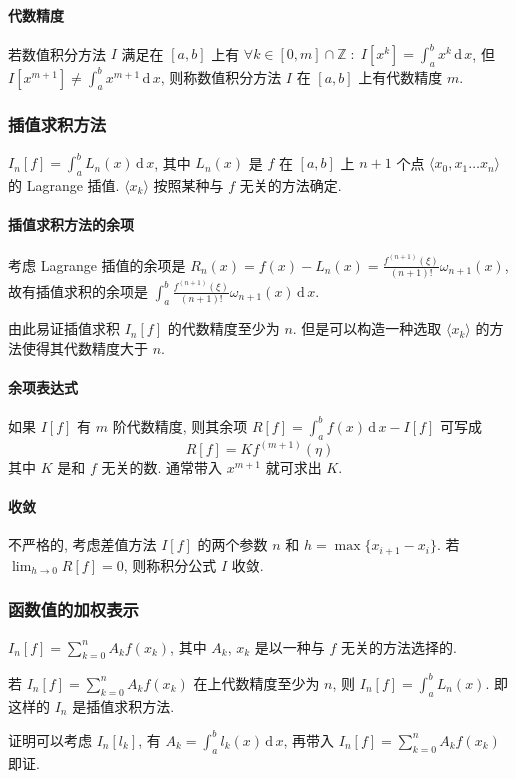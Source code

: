 \documentclass{ctexart}
\newcommand{\Zset}{\mathbb{Z}}
\newcommand{\ud}{\,\mathrm{d}\,}
\begin{document}
\paragraph{代数精度}
    若数值积分方法 $I$ 满足在 $[a,b]$ 上有
    $\forall k \in [0, m] \cap \Zset\;:\; I[x^k] = \int_a^b x^k \ud x$,
    但 $I[x^{m+1}] \neq \int_a^b x^{m+1} \ud x$,
    则称数值积分方法 $I$ 在 $[a,b]$ 上有代数精度 $m$.
\subsubsection{插值求积方法}
    $I_n[f] = \int_a^b L_n(x) \ud x$,
    其中 $L_n(x)$ 是 $f$ 在 $[a,b]$ 上 $n+1$ 个点
    $\langle x_0, x_1 \ldots x_n \rangle$ 的 Lagrange 插值.
    $\langle x_k \rangle$ 按照某种与 $f$ 无关的方法确定.
\paragraph{插值求积方法的余项}
    考虑 Lagrange 插值的余项是
    $R_n(x) = f(x) - L_n(x) =
        \frac{f^{(n+1)}(\xi)}{(n+1)!} \omega_{n+1}(x)$,
    故有插值求积的余项是
    $\int_a^b \frac{f^{(n+1)}(\xi)}{(n+1)!} \omega_{n+1}(x) \ud x$.\par
    由此易证插值求积 $I_n[f]$ 的代数精度至少为 $n$.
    但是可以构造一种选取 $\langle x_k \rangle$
    的方法使得其代数精度大于 $n$.
\paragraph{余项表达式}
    如果 $I[f]$ 有 $m$ 阶代数精度, 则其余项 $R[f] = \int_a^b f(x) \ud x - I[f]$
    可写成 \[
        R[f] = K f^{(m+1)}(\eta)\]
    其中 $K$ 是和 $f$ 无关的数. 通常带入 $x^{m+1}$ 就可求出 $K$.
\paragraph{收敛}
    不严格的, 考虑差值方法 $I[f]$ 的两个参数 $n$ 和 $h = \max\{x_{i+1} - x_i\}$.
    若 $\lim_{h\to 0} R[f] = 0$, 则称积分公式 $I$ 收敛.
\subsubsection{函数值的加权表示}
    $I_n[f] = \sum_{k = 0}^n A_k f(x_k)$,
    其中 $A_k$, $x_k$ 是以一种与 $f$ 无关的方法选择的.\par
    若 $I_n[f] = \sum_{k=0}^n A_k f(x_k)$ 在上代数精度至少为 $n$,
    则 $I_n[f] = \int_a^b L_n(x)$. 即这样的 $I_n$ 是插值求积方法.\par
    证明可以考虑 $I_n[l_k]$, 有 $A_k = \int_a^b l_k(x) \ud x$,
    再带入 $I_n[f] = \sum_{k=0}^n A_k f(x_k)$ 即证.
\end{document}
